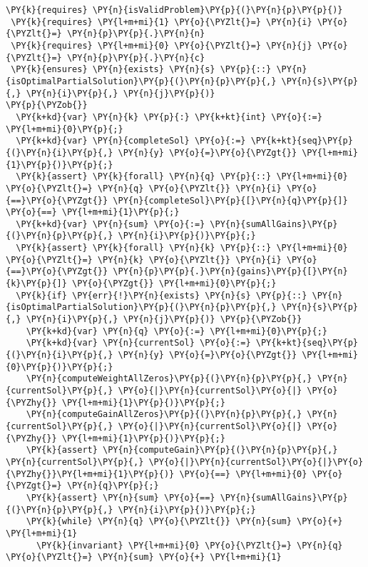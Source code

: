\begin{sloppypar}
\begin{enumerate}
\begin{Verbatim}[commandchars=\\\{\}]
 \PY{k}{requires} \PY{n}{isValidProblem}\PY{p}{(}\PY{n}{p}\PY{p}{)}
 \PY{k}{requires} \PY{l+m+mi}{1} \PY{o}{\PYZlt{}=} \PY{n}{i} \PY{o}{\PYZlt{}=} \PY{n}{p}\PY{p}{.}\PY{n}{n}
 \PY{k}{requires} \PY{l+m+mi}{0} \PY{o}{\PYZlt{}=} \PY{n}{j} \PY{o}{\PYZlt{}=} \PY{n}{p}\PY{p}{.}\PY{n}{c}
 \PY{k}{ensures} \PY{n}{exists} \PY{n}{s} \PY{p}{::} \PY{n}{isOptimalPartialSolution}\PY{p}{(}\PY{n}{p}\PY{p}{,} \PY{n}{s}\PY{p}{,} \PY{n}{i}\PY{p}{,} \PY{n}{j}\PY{p}{)}
\PY{p}{\PYZob{}}
  \PY{k+kd}{var} \PY{n}{k} \PY{p}{:} \PY{k+kt}{int} \PY{o}{:=} \PY{l+m+mi}{0}\PY{p}{;}
  \PY{k+kd}{var} \PY{n}{completeSol} \PY{o}{:=} \PY{k+kt}{seq}\PY{p}{(}\PY{n}{i}\PY{p}{,} \PY{n}{y} \PY{o}{=}\PY{o}{\PYZgt{}} \PY{l+m+mi}{1}\PY{p}{)}\PY{p}{;}
  \PY{k}{assert} \PY{k}{forall} \PY{n}{q} \PY{p}{::} \PY{l+m+mi}{0} \PY{o}{\PYZlt{}=} \PY{n}{q} \PY{o}{\PYZlt{}} \PY{n}{i} \PY{o}{==}\PY{o}{\PYZgt{}} \PY{n}{completeSol}\PY{p}{[}\PY{n}{q}\PY{p}{]} \PY{o}{==} \PY{l+m+mi}{1}\PY{p}{;}
  \PY{k+kd}{var} \PY{n}{sum} \PY{o}{:=} \PY{n}{sumAllGains}\PY{p}{(}\PY{n}{p}\PY{p}{,} \PY{n}{i}\PY{p}{)}\PY{p}{;}
  \PY{k}{assert} \PY{k}{forall} \PY{n}{k} \PY{p}{::} \PY{l+m+mi}{0} \PY{o}{\PYZlt{}=} \PY{n}{k} \PY{o}{\PYZlt{}} \PY{n}{i} \PY{o}{==}\PY{o}{\PYZgt{}} \PY{n}{p}\PY{p}{.}\PY{n}{gains}\PY{p}{[}\PY{n}{k}\PY{p}{]} \PY{o}{\PYZgt{}} \PY{l+m+mi}{0}\PY{p}{;}
  \PY{k}{if} \PY{err}{!}\PY{n}{exists} \PY{n}{s} \PY{p}{::} \PY{n}{isOptimalPartialSolution}\PY{p}{(}\PY{n}{p}\PY{p}{,} \PY{n}{s}\PY{p}{,} \PY{n}{i}\PY{p}{,} \PY{n}{j}\PY{p}{)} \PY{p}{\PYZob{}}
    \PY{k+kd}{var} \PY{n}{q} \PY{o}{:=} \PY{l+m+mi}{0}\PY{p}{;} 
    \PY{k+kd}{var} \PY{n}{currentSol} \PY{o}{:=} \PY{k+kt}{seq}\PY{p}{(}\PY{n}{i}\PY{p}{,} \PY{n}{y} \PY{o}{=}\PY{o}{\PYZgt{}} \PY{l+m+mi}{0}\PY{p}{)}\PY{p}{;}
    \PY{n}{computeWeightAllZeros}\PY{p}{(}\PY{n}{p}\PY{p}{,} \PY{n}{currentSol}\PY{p}{,} \PY{o}{|}\PY{n}{currentSol}\PY{o}{|} \PY{o}{\PYZhy{}} \PY{l+m+mi}{1}\PY{p}{)}\PY{p}{;}
    \PY{n}{computeGainAllZeros}\PY{p}{(}\PY{n}{p}\PY{p}{,} \PY{n}{currentSol}\PY{p}{,} \PY{o}{|}\PY{n}{currentSol}\PY{o}{|} \PY{o}{\PYZhy{}} \PY{l+m+mi}{1}\PY{p}{)}\PY{p}{;}
    \PY{k}{assert} \PY{n}{computeGain}\PY{p}{(}\PY{n}{p}\PY{p}{,} \PY{n}{currentSol}\PY{p}{,} \PY{o}{|}\PY{n}{currentSol}\PY{o}{|}\PY{o}{\PYZhy{}}\PY{l+m+mi}{1}\PY{p}{)} \PY{o}{==} \PY{l+m+mi}{0} \PY{o}{\PYZgt{}=} \PY{n}{q}\PY{p}{;}
    \PY{k}{assert} \PY{n}{sum} \PY{o}{==} \PY{n}{sumAllGains}\PY{p}{(}\PY{n}{p}\PY{p}{,} \PY{n}{i}\PY{p}{)}\PY{p}{;}
    \PY{k}{while} \PY{n}{q} \PY{o}{\PYZlt{}} \PY{n}{sum} \PY{o}{+} \PY{l+m+mi}{1}
      \PY{k}{invariant} \PY{l+m+mi}{0} \PY{o}{\PYZlt{}=} \PY{n}{q} \PY{o}{\PYZlt{}=} \PY{n}{sum} \PY{o}{+} \PY{l+m+mi}{1}

\end{Verbatim}
\end{enumerate}
\end{sloppypar}

